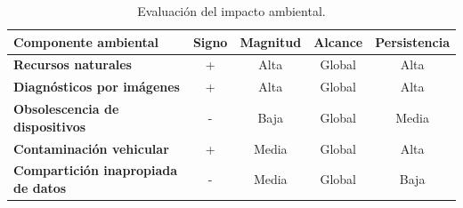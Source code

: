 {\begin{table}[h]
{{\begin{tabular}{|l|c|c|c|c|}
            \hline
            {\bf Componente ambiental} & {\bf Signo} & {\bf Magnitud} & {\bf Alcance} & {\bf Persistencia} \\ \hline
            {\bf Recursos naturales}
                                       & +           & Alta           & Global        & Alta               \\ \hline
            {\bf Diagnósticos por imágenes}
                                       & +           & Alta           & Global        & Alta               \\ \hline
            {\bf Obsolescencia de dispositivos}
                                       & -           & Baja           & Global        & Media              \\ \hline
            {\bf Contaminación vehicular}
                                       & +           & Media          & Global        & Alta               \\ \hline
            {\bf Compartición inapropiada de datos}
                                       & -           & Media          & Global        & Baja               \\ \hline
        \end{tabular}
        }
    }
    \caption{Evaluación del impacto ambiental.}
    \label{evaluacion-impacto-ambiental}
\end{table}
}

